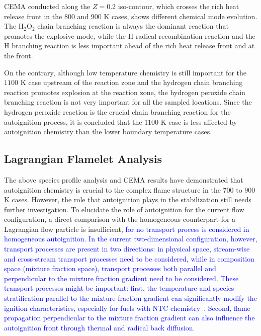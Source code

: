 \documentclass[review,3p,times]{elsarticle}
\begin{document}
CEMA conducted along the $Z = 0.2$ iso-contour, which crosses the rich heat release front in the $800$ and $900$ K cases, shows different chemical mode evolution.  The H$_2$O$_2$ chain branching reaction is always the dominant reaction that promotes the explosive mode, while the H radical recombination reaction and the H branching reaction is less important ahead of the rich heat release front and at the front.  


On the contrary, although low temperature chemistry is still important for the $1100$ K case upstream of the reaction zone and the hydrogen chain branching reaction promotes explosion at the reaction zone, the hydrogen peroxide chain branching reaction is not very important for all the sampled locations.  Since the hydrogen peroxide reaction is the crucial chain branching reaction for the autoignition process, it is concluded that the $1100$ K case is less affected by autoignition chemistry than the lower boundary temperature cases.  

\subsection{Lagrangian Flamelet Analysis} \label{sec:LFA}
The above species profile analysis and CEMA results have demonstrated that autoignition chemistry is crucial to the complex flame structure in the $700$ to $900$ K cases.  However, the role that autoignition plays in the stabilization still needs further investigation.  To elucidate the role of autoignition for the current flow configuration, a direct comparison with the homogeneous counterpart for a Lagrangian flow particle is insufficient, \textcolor{blue}{for no transport process is considered in homogeneous autoignition.  In the current two-dimensional configuration, however, transport processes are present in two directions: in physical space, stream-wise and cross-stream transport processes need to be considered, while in composition space (mixture fraction space), transport processes both parallel and perpendicular to the mixture fraction gradient need to be considered.  These transport processes might be important: first, the temperature and species stratification parallel to the mixture fraction gradient can significantly modify the ignition characteristics, especially for fuels with NTC chemistry~\cite{law12,deng14}.  Second, flame propagation perpendicular to the mixture fraction gradient can also influence the autoignition front through thermal and radical back diffusion.}
\end{document}
